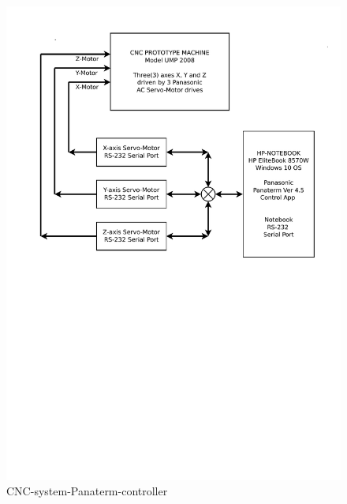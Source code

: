 \begin{figure}
	\caption{CNC-system-Panaterm-controller}
	\label{CNC-system-Panaterm-controller.pdf}
	\includegraphics[width=1.00\textwidth]{Chap3/work-setup/CNC-system-Panaterm-controller.pdf} 
\end{figure}



